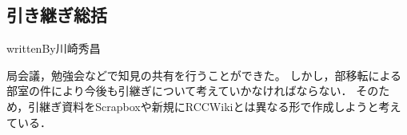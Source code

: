 \subsection*{引き継ぎ総括}

writtenBy{\systemStaff}{川崎}{秀昌}

局会議，勉強会などで知見の共有を行うことができた。
しかし，部移転による部室の件により今後も引継ぎについて考えていかなければならない．
そのため，引継ぎ資料をScrapboxや新規にRCCWikiとは異なる形で作成しようと考えている．
